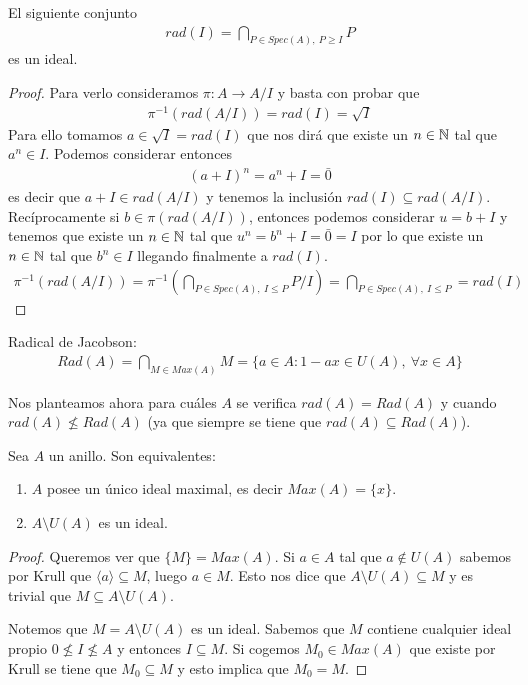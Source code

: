 \begin{coro}
    El siguiente conjunto
    \begin{gather*}
        rad(I) = \bigcap_{P\in Spec(A),\ P\geq I} P
    \end{gather*}
    es un ideal.
    \begin{proof}
        Para verlo consideramos $\pi : A \to A/I$ y basta con probar que 
        \begin{gather*}
            \pi^{-1}(rad(A/I)) = rad(I) = \sqrt{I}
        \end{gather*}
        Para ello tomamos $a\in \sqrt{I}=rad(I)$ que nos dirá que existe un $n\in \mathbb{N}$ tal que $a^n\in I$. Podemos considerar entonces
        \begin{gather*}
            (a+I)^n = a^n + I = \bar{0}
        \end{gather*}
        es decir que $a+I\in rad(A/I)$ y tenemos la inclusión $rad(I)\subseteq rad(A/I)$.\\

        Recíprocamente si $b\in \pi(rad(A/I))$, entonces podemos considerar $u=b+I$ y tenemos que existe un $n\in \mathbb{N}$ tal que $u^n = b^n + I = \bar{0} = I$ por lo que existe un $n\in \mathbb{N}$ tal que $b^n\in I$ llegando finalmente a $rad(I)$.
        \begin{gather*}
            \pi^{-1}(rad(A/I)) = \pi^{-1}\left( \bigcap_{P\in Spec(A),\ I\leq P} P/I\right) = \bigcap_{P\in Spec(A),\ I\leq P} = rad(I)
        \end{gather*}
    \end{proof}
\end{coro}

Radical de Jacobson:
\begin{gather*}
    Rad(A) = \bigcap_{M\in Max(A)} M = \{a\in A : 1-ax\in U(A),\ \forall x \in A\}
\end{gather*}

Nos planteamos ahora para cuáles $A$ se verifica $rad(A)=Rad(A)$ y cuando $rad(A) \not\leq Rad(A)$ (ya que siempre se tiene que $rad(A)\subseteq Rad(A)$).

\begin{lema}
    Sea $A$ un anillo. Son equivalentes:
    \begin{enumerate}
        \item $A$ posee un único ideal maximal, es decir $Max(A) = \{x\}$.
        \item $A\setminus U(A)$ es un ideal.
    \end{enumerate}
    \begin{proof}
        \item[(1)$\Rightarrow (2)$ )] Queremos ver que $\{M\} = Max(A)$. Si $a\in A$ tal que $a\notin U(A)$ sabemos por Krull que $\langle a \rangle \subseteq M$, luego $a\in M$. Esto nos dice que $A\setminus U(A)\subseteq M$ y es trivial que $M\subseteq A\setminus U(A)$.
        \item[(2)$\Rightarrow (1)$ )] Notemos que $M=A\setminus U(A)$ es un ideal. Sabemos que $M$ contiene cualquier ideal propio $0\not\leq I \not\leq A$ y entonces $I\subseteq M$. Si cogemos $M_0\in Max(A)$ que existe por Krull se tiene que $M_0\subseteq M$ y esto implica que $M_0=M$.
    \end{proof}
\end{lema}
